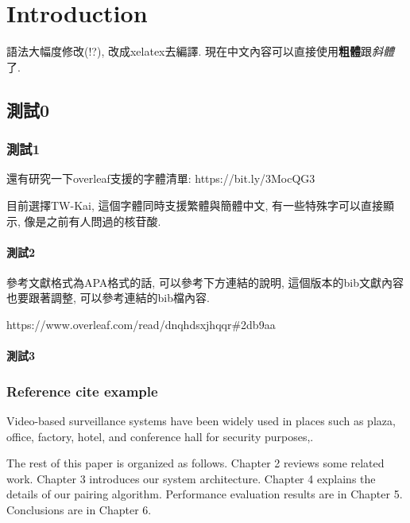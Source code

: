 \chapter{Introduction}
\label{ch:intro}

語法大幅度修改(!?), 改成xelatex去編譯. 現在中文內容可以直接使用\textbf{粗體}跟\textit{斜體}了. 

\section{測試0}

\subsection{測試1}

還有研究一下overleaf支援的字體清單: https://bit.ly/3MocQG3

目前選擇TW-Kai, 這個字體同時支援繁體與簡體中文, 有一些特殊字可以直接顯示, 像是之前有人問過的核苷酸.

\subsubsection{測試2}

參考文獻格式為APA格式的話, 可以參考下方連結的說明, 這個版本的bib文獻內容也要跟著調整, 可以參考連結的bib檔內容.

https://www.overleaf.com/read/dnqhdsxjhqqr\#2db9aa

\subsubsection{測試3}



\subsection{Reference cite example}
 
Video-based surveillance systems have been widely used in places such as plaza, office, factory, hotel, and conference hall for security purposes\cite{collins2000system},\cite{wang2013intelligent}. 

The rest of this paper is organized as follows. Chapter 2 reviews some related work. Chapter 3 introduces our system architecture. Chapter 4 explains the details of our pairing algorithm. Performance evaluation results are in Chapter 5. Conclusions are in Chapter 6.
